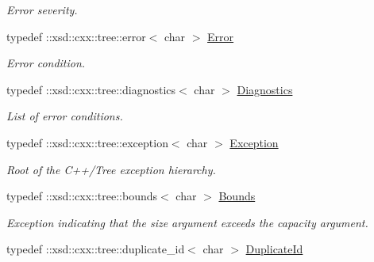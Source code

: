 \begin{DoxyCompactItemize}
\begin{DoxyCompactList}\small\item\em Error severity. \item\end{DoxyCompactList}\item 
\hypertarget{namespacexml__schema_a21e804b3775e71d965fc63126fa6f4cb}{
typedef ::xsd::cxx::tree::error$<$ char $>$ \hyperlink{namespacexml__schema_a21e804b3775e71d965fc63126fa6f4cb}{Error}}
\label{namespacexml__schema_a21e804b3775e71d965fc63126fa6f4cb}

\begin{DoxyCompactList}\small\item\em Error condition. \item\end{DoxyCompactList}\item 
\hypertarget{namespacexml__schema_aeacc5a291452af2cabc910be1bae640d}{
typedef ::xsd::cxx::tree::diagnostics$<$ char $>$ \hyperlink{namespacexml__schema_aeacc5a291452af2cabc910be1bae640d}{Diagnostics}}
\label{namespacexml__schema_aeacc5a291452af2cabc910be1bae640d}

\begin{DoxyCompactList}\small\item\em List of error conditions. \item\end{DoxyCompactList}\item 
\hypertarget{namespacexml__schema_ac873abff0228946d91e7ababf2cededc}{
typedef ::xsd::cxx::tree::exception$<$ char $>$ \hyperlink{namespacexml__schema_ac873abff0228946d91e7ababf2cededc}{Exception}}
\label{namespacexml__schema_ac873abff0228946d91e7ababf2cededc}

\begin{DoxyCompactList}\small\item\em Root of the C++/Tree exception hierarchy. \item\end{DoxyCompactList}\item 
\hypertarget{namespacexml__schema_a8ad4f95d0dda1ea131f69a7231deb0fe}{
typedef ::xsd::cxx::tree::bounds$<$ char $>$ \hyperlink{namespacexml__schema_a8ad4f95d0dda1ea131f69a7231deb0fe}{Bounds}}
\label{namespacexml__schema_a8ad4f95d0dda1ea131f69a7231deb0fe}

\begin{DoxyCompactList}\small\item\em Exception indicating that the size argument exceeds the capacity argument. \item\end{DoxyCompactList}\item 
\hypertarget{namespacexml__schema_a54fd4ff8caf281b84358720a39d7573a}{
typedef ::xsd::cxx::tree::duplicate\_\-id$<$ char $>$ \hyperlink{namespacexml__schema_a54fd4ff8caf281b84358720a39d7573a}{DuplicateId}}
\label{namespacexml__schema_a54fd4ff8caf281b84358720a39d7573a}


\end{DoxyCompactItemize}
